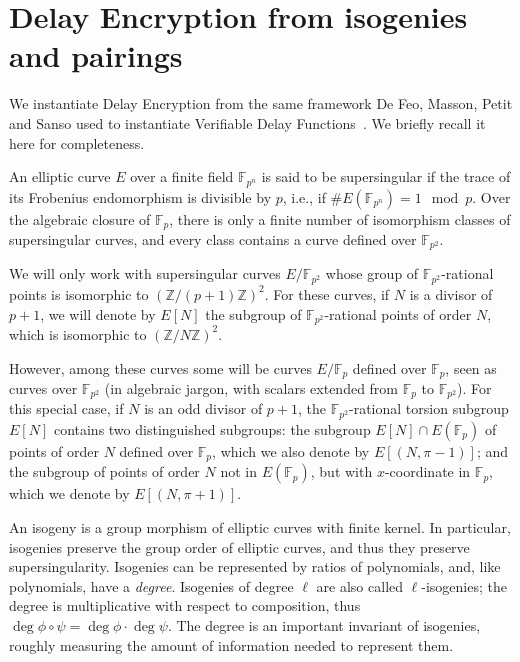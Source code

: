 \documentclass{llncs}
\newcommand{\Z}{\mathbb{Z}}
\newcommand{\F}{\mathbb{F}}
\begin{document}
\section{Delay Encryption from isogenies and pairings}
\label{sec:delay-encrypt-from}

We instantiate Delay Encryption from the same framework De Feo,
Masson, Petit and Sanso used to instantiate Verifiable Delay
Functions~\cite{10.1007/978-3-030-34578-5_10}. %
We briefly recall it here for completeness.

An elliptic curve $E$ over a finite field $\F_{p^n}$ is said to be
supersingular if the trace of its Frobenius endomorphism is divisible
by $p$, i.e., if $\#E(\F_{p^n})=1\mod p$. %
Over the algebraic closure of $\F_p$, there is only a finite number of
isomorphism classes of supersingular curves, and every class contains
a curve defined over $\F_{p^2}$. %

We will only work with supersingular curves $E/\F_{p^2}$ whose group
of $\F_{p^2}$-rational points is isomorphic to ${(\Z/(p+1)\Z)}^2$. %
For these curves, if $N$ is a divisor of $p+1$, we will denote by
$E[N]$ the subgroup of $\F_{p^2}$-rational points of order $N$, which
is isomorphic to ${(\Z/N\Z)}^2$.

However, among these curves some will be curves $E/\F_p$ defined over
$\F_p$, seen as curves over $\F_{p^2}$ (in algebraic jargon, with
scalars extended from $\F_p$ to $\F_{p^2}$). %
For this special case, if $N$ is an odd divisor of $p+1$, the
$\F_{p^2}$-rational torsion subgroup $E[N]$ contains two distinguished
subgroups: the subgroup $E[N]\cap E(\F_p)$ of points of order $N$
defined over $\F_p$, which we also denote by $E[(N,\pi-1)]$; and the
subgroup of points of order $N$ not in $E(\F_p)$, but with
$x$-coordinate in $\F_p$, which we denote by $E[(N,\pi+1)]$.

An isogeny is a group morphism of elliptic curves with finite
kernel. %
In particular, isogenies preserve the group order of elliptic curves,
and thus they preserve supersingularity. %
Isogenies can be represented by ratios of polynomials, and, like
polynomials, have a \emph{degree}. %
Isogenies of degree $\ell$ are also called $\ell$-isogenies; the
degree is multiplicative with respect to composition, thus
$\deg\phi\circ\psi=\deg\phi\cdot\deg\psi$. %
The degree is an important invariant of isogenies, roughly measuring
the amount of information needed to represent them.
\end{document}
